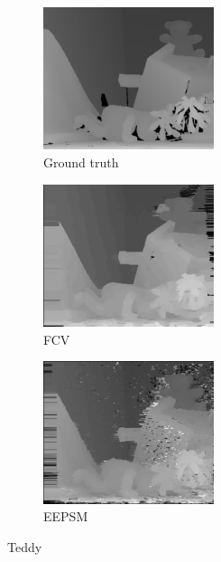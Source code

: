 \begin{figure}[ht]
  \centering
  \begin{subfigure}[t]{0.3\textwidth}
    \centering\includegraphics[width=5cm]{figures/ted_gt}
    \caption{Ground truth \cite{Scharstein2003}\label{fig:ted_gt}}
  \end{subfigure}\hspace{0.5cm}
  \begin{subfigure}[t]{0.3\textwidth}
    \centering\includegraphics[width=5cm]{figures/ted_fcv}
    \caption{FCV\label{fig:ted_fcv}}
  \end{subfigure}\hspace{0.5cm}
  \begin{subfigure}[t]{0.3\textwidth}
    \centering\includegraphics[width=5cm]{figures/ted_eepsm1}
    \caption{EEPSM\label{fig:ted_eepsm}}
  \end{subfigure}
  \caption{Teddy \label{fig:tedall}}
\end{figure}

